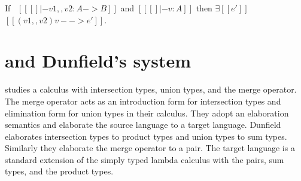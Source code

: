 
\begin{lemma}
  If \ $[[ [] |- v1,,v2 : A->B]]$ and $[[ [] |- v : A]]$ then $\exists [[e']]$ $[[(v1,,v2) v --> e']]$.
  \label{lemma:merge:app:progress}
\end{lemma}








\section{\namems and Dunfield's system}
\label{merge:dunfield:cal}
\cite{dunfield2014elaborating} studies a calculus with 
intersection types, union types,
and the merge operator.
The merge operator acts as an 
introduction form for intersection types
and elimination form for union types in their calculus.
They adopt an elaboration 
semantics and elaborate the source language to a 
target language. Dunfield elaborates
intersection types to product types and union types to sum types.
Similarly they elaborate the merge operator to a pair.
The target language is a standard extension of the simply typed
lambda calculus with the pairs, sum types, and the product types.

